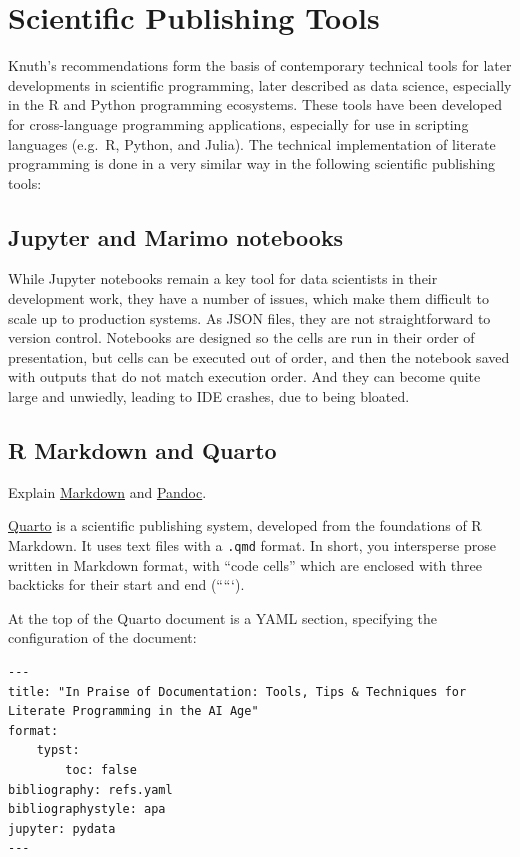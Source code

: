 \documentclass[
  letterpaper,
  DIV=11,
  numbers=noendperiod]{scrartcl}
\begin{document}
\section{Scientific Publishing Tools}\label{scientific-publishing-tools}

Knuth's recommendations form the basis of contemporary technical tools
for later developments in scientific programming, later described as
data science, especially in the R and Python programming ecosystems.
These tools have been developed for cross-language programming
applications, especially for use in scripting languages (e.g.~R, Python,
and Julia). The technical implementation of literate programming is done
in a very similar way in the following scientific publishing tools:

\subsection{Jupyter and Marimo
notebooks}\label{jupyter-and-marimo-notebooks}

While Jupyter notebooks remain a key tool for data scientists in their
development work, they have a number of issues, which make them
difficult to scale up to production systems. As JSON files, they are not
straightforward to version control. Notebooks are designed so the cells
are run in their order of presentation, but cells can be executed out of
order, and then the notebook saved with outputs that do not match
execution order. And they can become quite large and unwiedly, leading
to IDE crashes, due to being bloated.

\subsection{R Markdown and Quarto}\label{r-markdown-and-quarto}

Explain \href{https://www.markdownguide.org/}{Markdown} and
\href{https://pandoc.org/}{Pandoc}.

\href{https://quarto.org/}{Quarto} is a scientific publishing system,
developed from the foundations of R Markdown. It uses text files with a
\texttt{.qmd} format. In short, you intersperse prose written in
Markdown format, with ``code cells'' which are enclosed with three
backticks for their start and end (`````).

At the top of the Quarto document is a YAML section, specifying the
configuration of the document:

\begin{verbatim}
---
title: "In Praise of Documentation: Tools, Tips & Techniques for Literate Programming in the AI Age"
format: 
    typst: 
        toc: false
bibliography: refs.yaml
bibliographystyle: apa
jupyter: pydata
---
\end{verbatim}
\end{document}

